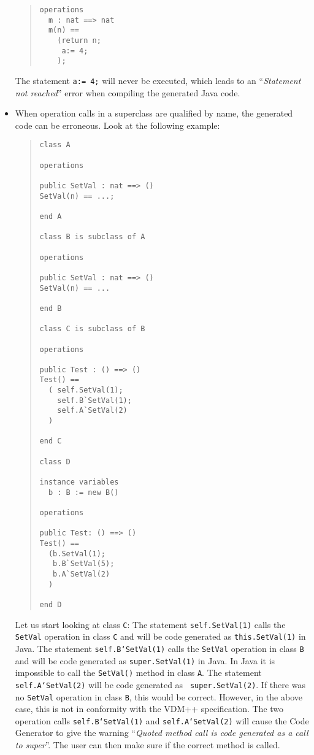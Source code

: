 \documentclass[\pformat,11pt]{article}
\begin{document}
\begin{itemize}
\begin{quote}
\begin{small}
\begin{verbatim}
operations
  m : nat ==> nat
  m(n) ==
    (return n;
     a:= 4;
    );
\end{verbatim}
\end{small}
\end{quote}

The statement {\tt a:= 4;} will never be executed, which leads to an ``{\em Statement not reached}'' error when compiling the generated Java code.
\item When operation calls in a superclass are qualified by name, the generated code can be erroneous. Look at the following example:

\begin{quote}
\begin{small}
\begin{verbatim}
class A

operations

public SetVal : nat ==> ()
SetVal(n) == ...;

end A

class B is subclass of A

operations

public SetVal : nat ==> ()
SetVal(n) == ...

end B

class C is subclass of B

operations

public Test : () ==> ()
Test() ==
  ( self.SetVal(1);
    self.B`SetVal(1);
    self.A`SetVal(2)
  )

end C

class D

instance variables
  b : B := new B()

operations

public Test: () ==> ()
Test() ==
  (b.SetVal(1);
   b.B`SetVal(5);
   b.A`SetVal(2)
  )

end D
\end{verbatim}
\end{small}
\end{quote}

  Let us start looking at class {\tt C}: The statement {\tt self.SetVal(1)}
  calls the {\tt SetVal} operation in class {\tt C} and will be code generated
  as {\tt this.SetVal(1)} in Java.  The statement {\tt self.B`SetVal(1)}
  calls the {\tt SetVal} operation in class  {\tt B} and will be code generated
  as {\tt super.SetVal(1)} in Java.  In Java it is impossible to
  call the {\tt SetVal()} method in class {\tt A}.  The statement {\tt
    self.A`SetVal(2)} will be code generated as {\tt
    super.SetVal(2)}. If there was no {\tt SetVal} operation in
  class {\tt B}, this would be correct. However, in the above case, this is
  not in conformity with the VDM++ specification. 
  The two operation calls
  {\tt self.B`SetVal(1)} and {\tt self.A`SetVal(2)} will cause the
  Code Generator to give the warning ``{\em Quoted method call is code generated as a call to super}''.  The user can then make sure if
  the correct method is called.
  

\end{itemize}
\end{document}
